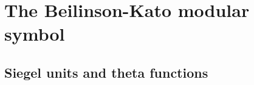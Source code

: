 \documentclass[12pt,amstex,amssymb]{article}
\theoremstyle{plain}
\newtheorem{corollary}[theorem]{Corollary}
\theoremstyle{definition}
\newtheorem{definition}[theorem]{Definition}
\def\Q{{\mathbb Q}}
\newcommand{\be}{\begin{eqnarray*}}
\newcommand{\ee}{\end{eqnarray*}}
\newcommand{\Res}{\operatorname{Res}}
\newcommand{\res}{\operatorname{res}}
\begin{document}







\section{The Beilinson-Kato modular symbol}\label{BeilinsonKato}

\subsection{Siegel units and theta functions}
\end{document}
